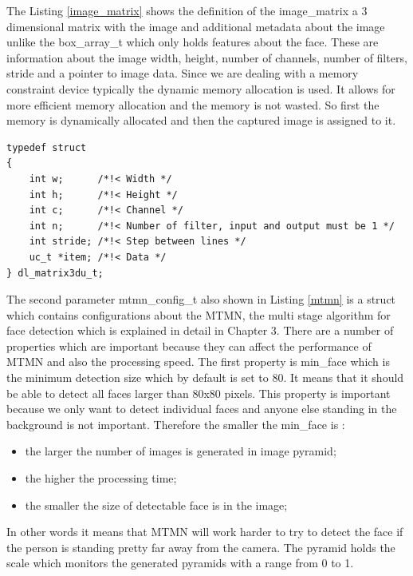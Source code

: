 The Listing \ref{image_matrix} shows the definition of the image\_matrix a 3 dimensional matrix with the image and additional metadata about the image unlike the {\selectfont box\_array\_t} which only holds features about the face. These are information about the image width, height, number of channels, number of filters, stride and a pointer to image data. Since we are dealing with a memory constraint device typically the dynamic memory allocation is used. It allows for more efficient memory allocation and the memory is not wasted. So first the memory is dynamically allocated and then the captured image is assigned to it. 




\begin{lstlisting}[caption={Image matrix structure},label=image_matrix, captionpos=b]
typedef struct
{
    int w;      /*!< Width */
    int h;      /*!< Height */
    int c;      /*!< Channel */
    int n;      /*!< Number of filter, input and output must be 1 */
    int stride; /*!< Step between lines */
    uc_t *item; /*!< Data */
} dl_matrix3du_t;

\end{lstlisting}


The second parameter {\selectfont mtmn\_config\_t} also shown in Listing \ref{mtmn} is a struct which contains configurations about the MTMN, the multi stage algorithm for face detection which is explained in detail in Chapter 3. There are a number of properties which are important because they can affect the performance of MTMN and also the processing speed. The first property is 
{\selectfont min\_face} which is the minimum detection size which by default is set to 80. It means that it should be able to detect all faces larger than 80x80 pixels. This property is important because we only want to detect individual faces and anyone else standing in the background is not important. Therefore the smaller the {\selectfont min\_face} is : 

\begin{itemize}
    \item the larger the number of images is generated in image pyramid;
    \item the higher the processing time;
     \item the smaller the size of detectable face is in the image;
\end{itemize}


In other words it means that MTMN will work harder to try to detect the face if the person is standing pretty far away from the camera. 
The {\selectfont pyramid} holds the scale which monitors the generated pyramids with a range from 0 to 1. 

